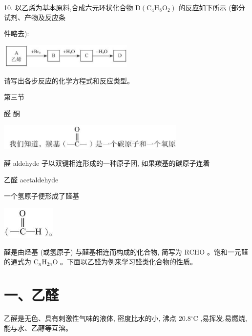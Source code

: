 \documentclass[10pt]{article}
\begin{document}
10. 以乙烯为基本原料,合成六元环状化合物 \(\mathrm{D}\left( {{\mathrm{C}}_{4}{\mathrm{H}}_{8}{\mathrm{O}}_{2}}\right)\) 的反应如下所示 (部分试剂、产物及反应条

件略去):

\begin{center}
\includegraphics[max width=0.5\textwidth]{images/0190efc5-b58a-7c43-bfb0-e0a030df9cfd_72_275696.jpg}
\end{center}

请写出各步反应的化学方程式和反应类型。

第三节

醛 酮

\begin{center}
\includegraphics[max width=0.7\textwidth]{images/0190efc5-b58a-7c43-bfb0-e0a030df9cfd_73_987434.jpg}
\end{center}

醛 aldehyde 子以双键相连形成的一种原子团, 如果羰基的碳原子连着

乙醛 acetaldehyde

一个氢原子便形成了醛基

\begin{center}
\includegraphics[max width=0.2\textwidth]{images/0190efc5-b58a-7c43-bfb0-e0a030df9cfd_73_360188.jpg}
\end{center}

醛是由烃基 (或氢原子) 与醛基相连而构成的化合物, 简写为 \(\mathrm{{RCHO}}\) 。饱和一元醛的通式为 \({\mathrm{C}}_{n}{\mathrm{H}}_{2n}\mathrm{O}\) 。下面以乙醛为例来学习醛类化合物的性质。

\section*{一、乙醛}

乙醛是无色、具有刺激性气味的液体, 密度比水的小, 沸点 \({20.8}{}^{ \circ }\mathrm{C}\) ,易挥发,易燃烧,能与水、乙醇等互溶。
\end{document}
